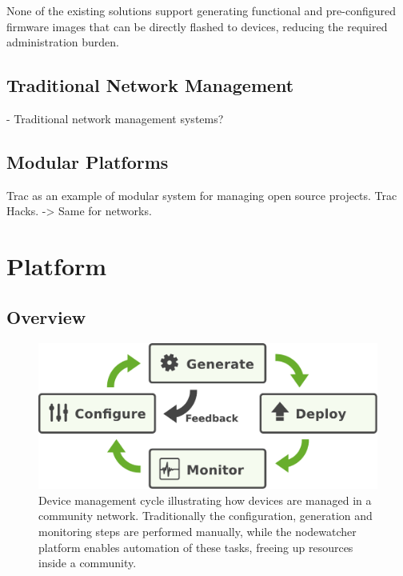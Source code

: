 \documentclass[5p,sort&compress]{elsarticle}
\begin{document}
None of the existing solutions support generating functional and pre-configured firmware images that can be directly flashed to devices, reducing the required administration burden.

\subsection{Traditional Network Management}

- Traditional network management systems?

\subsection{Modular Platforms}

Trac as an example of modular system for managing open source projects.
Trac Hacks. -> Same for networks.

\section{Platform}
\label{sec:platform}

\subsection{Overview}

\begin{figure}
  \centering
  \includegraphics[scale=0.4]{figures/device-mgmt-cycle.pdf}
  \caption{Device management cycle illustrating how devices are managed in a community network.
Traditionally the configuration, generation and monitoring steps are performed manually, while the nodewatcher platform enables automation of these tasks, freeing up resources inside a community.}
  \label{fig:device-mgmt-cycle}
\end{figure}

\end{document}
